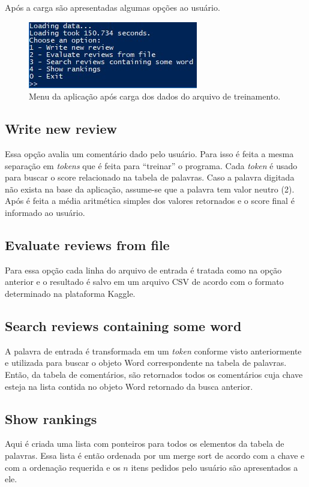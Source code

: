 \documentclass[12pt]{article}
\begin{document}
Após a carga são apresentadas algumas opções ao usuário.

\begin{figure}[ht]
\centering
\includegraphics[width=.5\textwidth]{menu.jpg}
\caption{Menu da aplicação após carga dos dados do arquivo de treinamento.}
\label{fig:menu}
\end{figure}

\subsection{Write new review}

Essa opção avalia um comentário dado pelo usuário. Para isso é feita a mesma separação em \emph{tokens} 
que é feita para ``treinar'' o programa. Cada \emph{token} é usado para buscar o score relacionado na tabela 
de palavras. Caso a palavra digitada não exista na base da aplicação, assume-se que a palavra tem valor neutro 
(2). Após é feita a média aritmética simples dos valores retornados e o score final é informado ao usuário.

\subsection{Evaluate reviews from file}

Para essa opção cada linha do arquivo de entrada é tratada como na opção anterior e o resultado é salvo em 
um arquivo CSV de acordo com o formato determinado na plataforma Kaggle.

\subsection{Search reviews containing some word}

A palavra de entrada é transformada em um \emph{token} conforme visto anteriormente e utilizada para buscar 
o objeto Word correspondente na tabela de palavras. Então, da tabela de comentários, são retornados todos os 
comentários cuja chave esteja na lista contida no objeto Word retornado da busca anterior.

\subsection{Show rankings}

Aqui é criada uma lista com ponteiros para todos os elementos da tabela de palavras. Essa lista é então ordenada 
por um merge sort de acordo com a chave e com a ordenação requerida e os $n$ itens pedidos pelo usuário são apresentados 
a ele.
\end{document}
